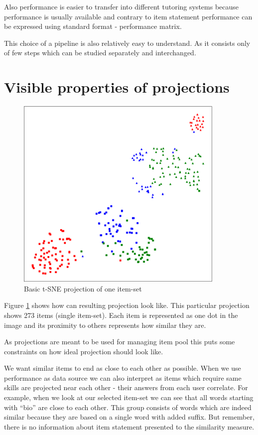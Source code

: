 \documentclass[
  digital, %
  table,   %
  nolof,     %
  nolot,     %
  nocover
]{fithesis3}
\begin{document}
Also performance is easier to transfer into different tutoring systems because performance is usually available and contrary to item statement performance can be expressed using standard format - performance matrix.

This choice of a pipeline is also relatively easy to understand. As it consists only of few steps which can be studied separately and interchanged.

\section{Visible properties of projections}\label{visible-properties-of-projections}


\begin{figure}
    \includegraphics[width=10cm]{img/common_projection}
  \caption{Basic t-SNE projection of one item-set}
  \label{fig:common_projection}
\end{figure}

Figure \ref{fig:common_projection} shows how can resulting projection look like. This particular projection shows 273 items (single item-set). Each item is represented as one dot in the image and its proximity to others represents how similar they are.


As projections are meant to be used for managing item pool this puts some constraints on how ideal projection should look like.

We want similar items to end as close to each other as possible. When we use performance as data source we can also interpret as items which require same skills are projected near each other - their answers from each user correlate. For example, when we look at our selected item-set we can see that all words starting with ``bio'' are close to each other. This group consists of words which are indeed similar because they are based on a single word with added suffix. But remember, there is no information about item statement presented to the similarity measure.
\end{document}
